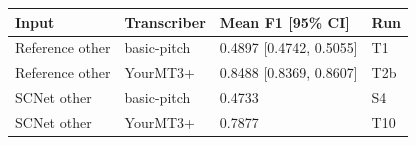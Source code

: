 \begin{tabular}{llll}
\toprule
Input & Transcriber & Mean F1 [95\% CI] & Run \\
\midrule
Reference other & basic-pitch & 0.4897 [0.4742, 0.5055] & T1 \\
Reference other & YourMT3+ & 0.8488 [0.8369, 0.8607] & T2b \\
SCNet other & basic-pitch & 0.4733 & S4 \\
SCNet other & YourMT3+ & 0.7877 & T10 \\
\bottomrule
\end{tabular}

